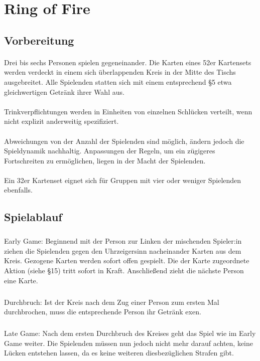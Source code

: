 \section{Ring of Fire}
\subsection{Vorbereitung}
\paragraph{}
Drei bis sechs Personen spielen gegeneinander. Die Karten eines 52er Kartensets werden verdeckt in einem sich überlappenden Kreis in der Mitte des Tischs ausgebreitet. Alle Spielenden statten sich mit einem entsprechend §5 etwa gleichwertigen Getränk ihrer Wahl aus.

\paragraph{}
Trinkverpflichtungen werden in Einheiten von einzelnen Schlücken verteilt, wenn nicht explizit anderweitig spezifiziert.

\paragraph{}
Abweichungen von der Anzahl der Spielenden sind möglich, ändern jedoch die Spieldynamik nachhaltig. Anpassungen der Regeln, um ein zügigeres Fortschreiten zu ermöglichen, liegen in der Macht der Spielenden.

\paragraph{}
Ein 32er Kartenset eignet sich für Gruppen mit vier oder weniger Spielenden ebenfalls.

\subsection{Spielablauf}
\paragraph{}
\subparagraph{}
Early Game: Beginnend mit der Person zur Linken der mischenden Spieler:in ziehen die Spielenden gegen den Uhrzeigersinn nacheinander Karten aus dem Kreis. Gezogene Karten werden sofort offen gespielt. Die der Karte zugeordnete Aktion (siehe §15) tritt sofort in Kraft. Anschließend zieht die nächste Person eine Karte.
\subparagraph{}
Durchbruch: Ist der Kreis nach dem Zug einer Person zum ersten Mal durchbrochen, muss die entsprechende Person ihr Getränk exen.
\subparagraph{}
Late Game: Nach dem ersten Durchbruch des Kreises geht das Spiel wie im Early Game weiter. Die Spielenden müssen nun jedoch nicht mehr darauf achten, keine Lücken entstehen lassen, da es keine weiteren diesbezüglichen Strafen gibt.

